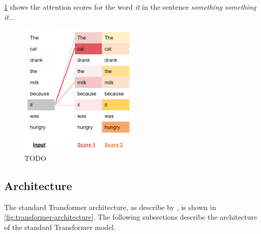 \cref{fig:attention-scores-example} shows the attention scores for the word \textit{it} in the sentence \textit{something something it..}.

\begin{figure}[htp]
    \centering
    \includegraphics[width=0.5\textwidth]{figures/attention-scores-example.png}
    \caption{TODO}
    \label{fig:attention-scores-example}
\end{figure}


\subsection{Architecture}
\label{sec:transformer-architecture}
The standard Transformer architecture, as describe by \citeyear{vaswani2017attention}, is shown in \cref{fig:transformer-architecture}. The following subsections describe the architecture of the standard Transformer model.


